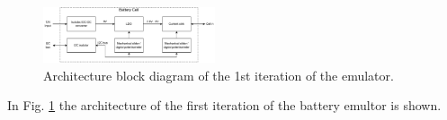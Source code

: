 \begin{figure}[h]
    \begin{center}
        \includegraphics[width=0.45\textwidth]{Battery_cell_diagram-Single_cell.pdf}
    \end{center}
    \caption{Architecture block diagram of the 1st iteration of the emulator.}
    \label{fig:1st_architecture}
\end{figure}

In Fig. \ref{fig:1st_architecture} the architecture of the first iteration 
of the battery emultor is shown.